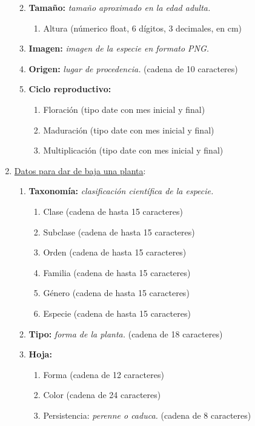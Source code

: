 \documentclass[10pt,a4paper]{article}
\begin{document}
\begin{enumerate}[label={RD\arabic*.} ,leftmargin=2.8\parindent]
\begin{enumerate}[label={RD2.\arabic*.}]
	\medskip
	\item
		\textbf{Tamaño:} \textit{tamaño aproximado en la edad adulta.}
	\begin{enumerate}[label=-]
		\item Altura (númerico float, 6 dígitos, 3 decimales, en cm)
	\end{enumerate}
	
	\medskip	
	\item
		\textbf{Imagen:} \textit{imagen de la especie en formato PNG.}

	\medskip 
	\item
		\textbf{Origen:} \textit{lugar de procedencia.} (cadena de 10 caracteres)
		
	\medskip 
	\item
		\textbf{Ciclo reproductivo:}
	\begin{enumerate} [label=-]
		\item Floración (tipo date con mes inicial y final)
		\item Maduración (tipo date con mes inicial y final)
		\item Multiplicación (tipo date con mes inicial y final)
	\end{enumerate}				
	\medskip 
	\medskip
	\end{enumerate}

	\item \underline{Datos para dar de baja una planta}:
	\begin{enumerate}[label={RD3.\arabic*.}]
		\item 
		\textbf{Taxonomía:} \textit{clasificación científica de la especie.}
	\begin{enumerate}[label=-]
		\item Clase (cadena de hasta 15 caracteres)
		\item Subclase (cadena de hasta 15 caracteres)
		\item Orden (cadena de hasta 15 caracteres)
		\item Familia (cadena de hasta 15 caracteres)
		\item Género (cadena de hasta 15 caracteres)
		\item Especie (cadena de hasta 15 caracteres)
	\end{enumerate}
	\medskip
	\item 
		\textbf{Tipo:} \textit{forma de la planta.} (cadena de 18 caracteres)

	\medskip
	\item
		\textbf{Hoja:}
	\begin{enumerate}[label=-]
		\item Forma (cadena de 12 caracteres)
		\item Color (cadena de 24 caracteres)
		\item Persistencia: \textit{perenne o caduca.} (cadena de 8 caracteres)
	\end{enumerate}


\end{enumerate}
\end{enumerate}
\end{document}
